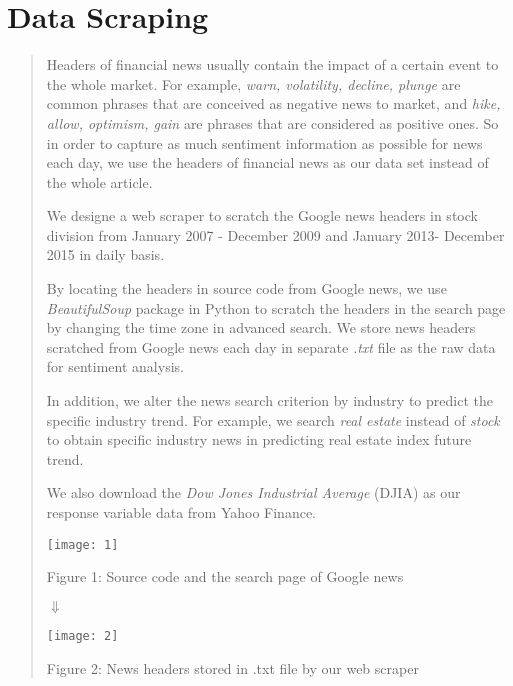 \documentclass[english]{article}
\begin{document}
\section{Data Scraping}
\begin{quotation}
Headers of financial news usually contain the impact of a certain
event to the whole market. For example, \emph{warn, volatility, decline,
plunge} are common phrases that are conceived as negative news to
market, and \emph{hike, allow, optimism, gain} are phrases that are
considered as positive ones. So in order to capture as much sentiment
information as possible for news each day, we use the headers of financial
news as our data set instead of the whole article.

We designe a web scraper to scratch the Google news headers in stock
division from January 2007 - December 2009 and January 2013- December
2015 in daily basis. 

By locating the headers in source code from Google news, we use \emph{BeautifulSoup}
package in Python to scratch the headers in the search page by changing
the time zone in advanced search. We store news headers scratched
from Google news each day in separate \emph{.txt} file as the raw
data for sentiment analysis. 

In addition, we alter the news search criterion by industry to predict
the specific industry trend. For example, we search\emph{ real estate}
instead of\emph{ stock} to obtain specific industry news in predicting
real estate index future trend.

We also download the \emph{Dow Jones Industrial Average} (DJIA) as
our response variable data from Yahoo Finance.
\begin{center}
\texttt{[image: 1]}
\par\end{center}
\begin{center}
Figure 1: Source code and the search page of Google news
\par\end{center}
\begin{center}
{\large{}$\Downarrow$}
\par\end{center}{\large \par}
\begin{center}
\texttt{[image: 2]}
\par\end{center}
\begin{center}
Figure 2: News headers stored in .txt file by our web scraper
\par\end{center}
\end{quotation}
\end{document}
